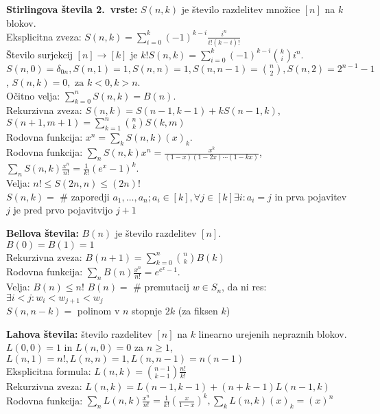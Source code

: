 \documentclass[a4paper, oneside, 12pt]{article}
\theoremstyle{definition}
\begin{document}
\textbf{Stirlingova števila 2.~vrste:} $S(n, k)$ je število razdelitev množice $[n]$ na $k$ blokov.\\
Eksplicitna zveza: $S(n,k) = \sum_{i= 0}^k (-1)^{k-i} \frac{i^n}{i! (k-i)!}$\\
Število surjekcij $[n] \to [k]$ je $k!S(n, k) = \sum_{i=0}^k (-1)^{k-i}\binom{k}{i}i^n$. \\
$S(n, 0) = \delta_{0n}, S(n, 1) = 1, S(n, n) = 1, S(n, n-1) = \binom{n}{2}, S(n, 2) = 2^{n-1}-1$,
$S(n, k) = 0, \text{ za } k < 0, k > n$.\\
Očitno velja: $\sum_{k=0}^nS(n, k) = B(n)$. \\
Rekurzivna zveza: $S(n, k) = S(n-1, k-1) + kS(n-1, k)$,
                  $S(n+1, m+1) = \sum_{k=1}^n\binom{n}{k}S(k, m)$ \\
Rodovna funkcija: $x^n = \sum_k S(n, k)(x)_k$. \\
Rodovna funkcija: $\sum_n S(n, k) x^n = \frac{x^k}{(1-x)(1-2x) \cdots (1-kx)}$,
                  $\sum_n S(n, k) \frac{x^n}{n!} = \frac{1}{k!}(e^x - 1)^k$. \\
Velja: $n! \leq S(2n, n) \leq (2n)!$\\
$S(n, k) = $ \# zaporedji $a_1, \ldots, a_n; a_i \in [k], \forall j \in [k] \exists i: a_i = j$ in prva pojavitev $j$ je pred prvo pojavitvijo $j+1$

\textbf{Bellova števila:} $B(n)$ je število razdelitev $[n]$.\\
$B(0) = B(1) = 1$\\
Rekurzivna zveza: $B(n+1) = \sum_{k=0}^n\binom{n}{k}B(k)$ \\
Rodovna funkcija: $\sum_n B(n)\frac{x^n}{n!} = e^{e^x - 1}$.\\
Velja: $B(n) \leq n!$
$B(n) = $ \# premutacij $w \in S_n$, da ni res: $\exists i < j: w_i < w_{j+1} < w_j$\\
$S(n, n-k) =  $ polinom v $n$ stopnje $2k$ (za fiksen $k$)



\textbf{Lahova števila:} število razdelitev $[n]$ na $k$ linearno urejenih nepraznih blokov.\\
 $L(0, 0)=1$ in $L(n, 0)= 0$ za $n\geq1$, $L(n, 1) = n!, L(n, n) = 1, L(n, n-1) = n(n-1)$\\
Eksplicitna formula: $L(n, k) =  \binom{n-1}{k-1} \frac{n!}{k!}$\\
Rekurzivna zveza: $L(n, k) = L(n-1, k-1) + (n+k-1) L(n-1, k)$\\
Rodovna funkcija: $\sum_n L(n, k) \frac{x^n}{n!} = \frac{1}{k!} (\frac{x}{1-x})^k, \sum_k L(n, k) (x)_k = (x)^n$
\end{document}
